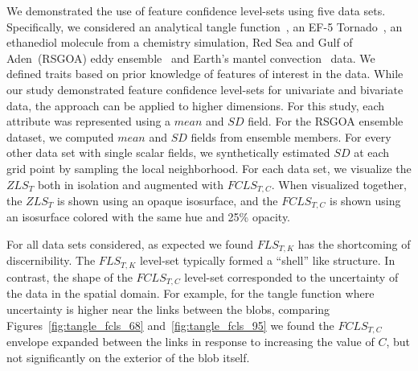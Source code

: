 %
We demonstrated the use of feature confidence level-sets using five data sets.
%
Specifically, we considered an analytical tangle function~\cite{knoll2009fast}, an EF-5 Tornado~\cite{atmos10100578}, an ethanediol molecule from a chemistry simulation, Red Sea and Gulf of Aden~(RSGOA) eddy ensemble~\cite{sanikommu2020impact} and Earth's mantel convection~\cite{shahnas2017mid} data.
%
We defined traits based on prior knowledge of features of interest in the data.
%
While our study demonstrated feature confidence level-sets for univariate and bivariate data, the approach can be applied to higher dimensions.
%
For this study, each attribute was represented using a $mean$ and $SD$ field. 
%
For the RSGOA ensemble dataset, we computed $mean$ and $SD$ fields from ensemble members. 
%
For every other data set with single scalar fields, we synthetically estimated $SD$ at each grid point by sampling the local neighborhood.
%
For each data set, we visualize the $ZLS_{T}$ both in isolation and augmented with $FCLS_{T,C}$. 
%
When visualized together, the $ZLS_{T}$ is shown using an opaque isosurface, and the $FCLS_{T,C}$ is shown using an isosurface colored with the same hue and 25\% opacity.

%

For all data sets considered, as expected we found $FLS_{T,K}$ has the shortcoming of discernibility.
%
The $FLS_{T,K}$ level-set typically formed a ``shell'' like structure.
%
In contrast, the shape of the $FCLS_{T,C}$ level-set corresponded to the uncertainty of the data in the spatial domain.
%
For example, for the tangle function where uncertainty is higher near the links between the blobs, comparing Figures~\ref{fig:tangle_fcls_68} and~\ref{fig:tangle_fcls_95} we found the $FCLS_{T,C}$ envelope expanded between the links in response to increasing the value of $C$, but not significantly on the exterior of the blob itself.

